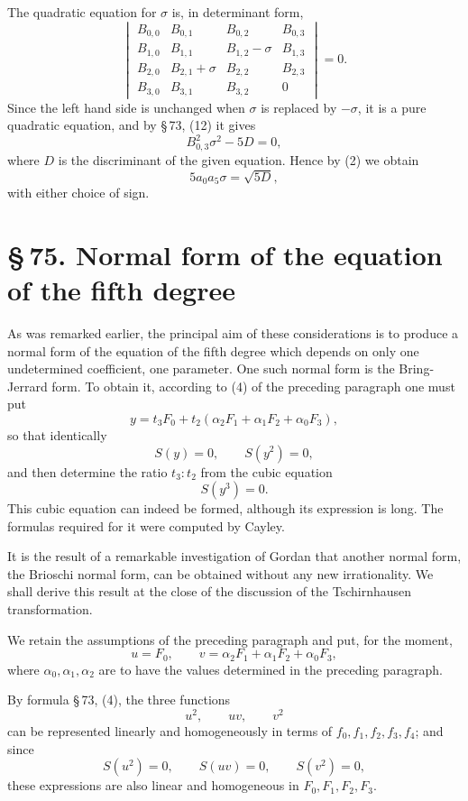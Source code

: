 \documentclass[11pt]{article}
\newcommand{\sect}[2]{\section*{\S\,#1. #2}}
\begin{document}
The quadratic equation for $\sigma$ is, in determinant form,
\[
\begin{vmatrix}
 B_{0,0}&B_{0,1}&B_{0,2}&B_{0,3}\\
 B_{1,0}&B_{1,1}&B_{1,2}-\sigma&B_{1,3}\\
 B_{2,0}&B_{2,1}+\sigma&B_{2,2}&B_{2,3}\\
 B_{3,0}&B_{3,1}&B_{3,2}&0
\end{vmatrix}=0.
\]
Since the left hand side is unchanged when $\sigma$ is replaced by $-\sigma$, it is a pure quadratic equation, and by \S\,73, (12) it gives
\[
 B_{0,3}^2\sigma^2-5D=0,
\]
where $D$ is the discriminant of the given equation. Hence by (2) we obtain
\begin{equation}
 5a_0a_5\sigma=\sqrt{5D},
\tag{12}
\end{equation}
with either choice of sign.

\sect{75}{Normal form of the equation of the fifth degree}

As was remarked earlier, the principal aim of these considerations is to produce a normal form of the equation of the fifth degree which depends on only one undetermined coefficient, one parameter. One such normal form is the Bring-Jerrard form. To obtain it, according to (4) of the preceding paragraph one must put
\begin{equation}
 y=t_3F_0+t_2(\alpha_2F_1+\alpha_1F_2+\alpha_0F_3),
\tag{1}
\end{equation}
so that identically
\[
 S(y)=0,
 \qquad S(y^2)=0,
\]
and then determine the ratio $t_3:t_2$ from the cubic equation
\[
 S(y^3)=0.
\]
This cubic equation can indeed be formed, although its expression is long. The formulas required for it were computed by Cayley.

It is the result of a remarkable investigation of Gordan that another normal form, the Brioschi normal form, can be obtained without any new irrationality. We shall derive this result at the close of the discussion of the Tschirnhausen transformation.

We retain the assumptions of the preceding paragraph and put, for the moment,
\begin{equation}
 u=F_0,
 \qquad
 v=\alpha_2F_1+\alpha_1F_2+\alpha_0F_3,
\tag{2}
\end{equation}
where $\alpha_0,\alpha_1,\alpha_2$ are to have the values determined in the preceding paragraph.

By formula \S\,73, (4), the three functions
\[
 u^2,
 \qquad uv,
 \qquad v^2
\]
can be represented linearly and homogeneously in terms of $f_0,f_1,f_2,f_3,f_4$; and since
\begin{equation}
 S(u^2)=0,
 \qquad S(uv)=0,
 \qquad S(v^2)=0,
\tag{3}
\end{equation}
these expressions are also linear and homogeneous in $F_0,F_1,F_2,F_3$.
\end{document}
